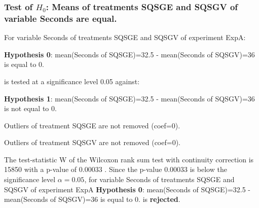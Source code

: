 \begin{frame}[t]
 \frametitle{Test of $H_{0}$: Means of treatments SQSGE and SQSGV of variable Seconds are equal. }
 \scriptsize
 For variable Seconds of treatments SQSGE and SQSGV of experiment ExpA:

\vspace{1mm}
{\bf Hypothesis 0}: mean(Seconds of SQSGE)=32.5 - mean(Seconds of SQSGV)=36 is equal to 0.


 \begin{center} is tested at a significance level 0.05 against: \end{center}

{\bf Hypothesis 1}: mean(Seconds of SQSGE)=32.5 - mean(Seconds of SQSGV)=36 is not equal to 0.
\vspace{1mm}
\vspace{1mm}

 Outliers of treatment SQSGE  are not removed (coef=0).

 Outliers of treatment SQSGV  are not removed (coef=0).
\vspace{1mm}
 
 The test-statistic W of the Wilcoxon rank sum test with continuity correction is 15850 with a p-value of 0.00033 .
 Since the p-value 0.00033 is below the significance level $\alpha= 0.05 $,
 for variable Seconds of treatments SQSGE and SQSGV of experiment ExpA 
 {\bf Hypothesis 0}: mean(Seconds of SQSGE)=32.5 - mean(Seconds of SQSGV)=36 is equal to 0.
is {\bf rejected}.

 \end{frame}

